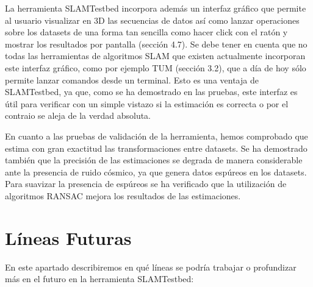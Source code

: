 La herramienta SLAMTestbed incorpora además un interfaz gráfico que permite al usuario visualizar en 3D las secuencias de datos así como lanzar operaciones sobre los datasets de una forma tan sencilla como hacer click con el ratón y mostrar los resultados por pantalla (sección 4.7). Se debe tener en cuenta que no todas las herramientas de algoritmos SLAM que existen actualmente incorporan este interfaz gráfico, como por ejemplo TUM (sección 3.2), que a día de hoy sólo permite lanzar comandos desde un terminal. Esto es una ventaja de SLAMTestbed, ya que, como se ha demostrado en las pruebas, este interfaz es útil para verificar con un simple vistazo si la estimación es correcta o por el contraio se aleja de la verdad absoluta.

En cuanto a las pruebas de validación de la herramienta, hemos comprobado que estima con gran exactitud las transformaciones entre datasets. Se ha demostrado también que la precisión de las estimaciones se degrada de manera considerable ante la presencia de ruido cósmico, ya que genera datos espúreos en los datasets. Para suavizar la presencia de espúreos se ha verificado que la utilización de algoritmos RANSAC mejora los resultados de las estimaciones.


\section{Líneas Futuras}

En este apartado describiremos en qué líneas se podría trabajar o profundizar más en el futuro en la herramienta SLAMTestbed:

